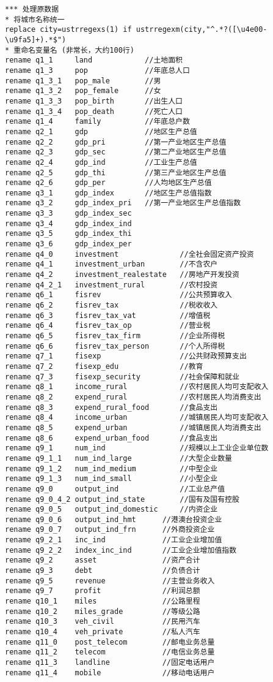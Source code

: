 \begin{framed}
\begin{verbatim}
*** 处理原数据
* 将城市名称统一
replace city=ustrregexs(1) if ustrregexm(city,"^.*?([\u4e00-\u9fa5]+).*$")
* 重命名变量名 (非常长，大约100行)
rename q1_1		land			//土地面积
rename q1_3		pop				//年底总人口
rename q1_3_1	pop_male		//男
rename q1_3_2	pop_female		//女
rename q1_3_3	pop_birth		//出生人口
rename q1_3_4	pop_death		//死亡人口
rename q1_4		family			//年底总户数
rename q2_1		gdp				//地区生产总值
rename q2_2		gdp_pri			//第一产业地区生产总值
rename q2_3		gdp_sec			//第二产业地区生产总值
rename q2_4		gdp_ind			//工业生产总值
rename q2_5		gdp_thi			//第三产业地区生产总值
rename q2_6		gdp_per			//人均地区生产总值
rename q3_1 	gdp_index		//地区生产总值指数
rename q3_2		gdp_index_pri	//第一产业地区生产总值指数
rename q3_3 	gdp_index_sec
rename q3_4		gdp_index_ind
rename q3_5		gdp_index_thi
rename q3_6		gdp_index_per
rename q4_0		investment				//全社会固定资产投资
rename q4_1		investment_urban 		//不含农户
rename q4_2		investment_realestate	//房地产开发投资
rename q4_2_1	investment_rural		//农村投资
rename q6_1		fisrev					//公共预算收入
rename q6_2		fisrev_tax				//税收收入
rename q6_3		fisrev_tax_vat			//增值税
rename q6_4		fisrev_tax_op			//营业税
rename q6_5		fisrev_tax_firm			//企业所得税
rename q6_6		fisrev_tax_person		//个人所得税
rename q7_1		fisexp					//公共财政预算支出
rename q7_2		fisexp_edu				//教育
rename q7_3 	fisexp_security			//社会保障和就业
rename q8_1		income_rural			//农村居民人均可支配收入
rename q8_2		expend_rural			//农村居民人均消费支出
rename q8_3		expend_rural_food		//食品支出
rename q8_4		income_urban			//城镇居民人均可支配收入
rename q8_5		expend_urban			//城镇居民人均消费支出
rename q8_6		expend_urban_food		//食品支出
rename q9_1		num_ind					//规模以上工业企业单位数
rename q9_1_1	num_ind_large			//大型企业数量
rename q9_1_2	num_ind_medium			//中型企业
rename q9_1_3	num_ind_small			//小型企业
rename q9_0		output_ind				//工业总产值
rename q9_0_4_2	output_ind_state		//国有及国有控股
rename q9_0_5	output_ind_domestic		//内资企业
rename q9_0_6	output_ind_hmt		//港澳台投资企业
rename q9_0_7	output_ind_frn		//外商投资企业
rename q9_2_1	inc_ind				//工业企业增加值
rename q9_2_2	index_inc_ind		//工业企业增加值指数
rename q9_2		asset				//资产合计
rename q9_3		debt				//负债合计
rename q9_5		revenue				//主营业务收入
rename q9_7		profit				//利润总额
rename q10_1	miles				//公路里程
rename q10_2	miles_grade			//等级公路
rename q10_3	veh_civil			//民用汽车
rename q10_4	veh_private			//私人汽车
rename q11_0	post_telecom		//邮电业务总量
rename q11_2	telecom				//电信业务总量
rename q11_3	landline			//固定电话用户
rename q11_4	mobile				//移动电话用户

\end{verbatim}
\end{framed}
